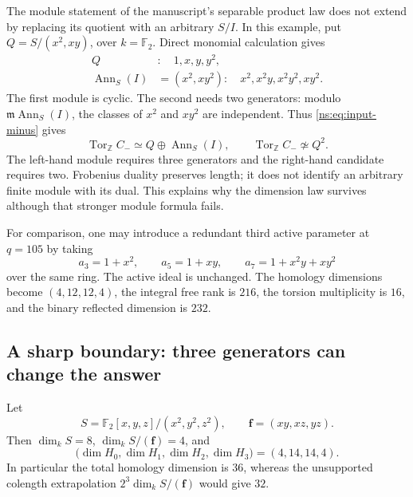 The module statement of the manuscript's separable product law does not
extend by replacing its quotient with an arbitrary $S/I$. In this example,
put $Q=S/(x^2,xy)$, over $k=\mathbb F_2$. Direct monomial calculation gives
\begin{align*}
 Q&:\quad 1,x,y,y^2,\\
 \operatorname{Ann}_S(I)&=(x^2,xy^2):\quad
             x^2,x^2y,x^2y^2,xy^2.
\end{align*}
The first module is cyclic. The second needs two generators: modulo
$\mathfrak m\operatorname{Ann}_S(I)$, the classes of $x^2$ and $xy^2$ are
independent. Thus \eqref{ns:eq:input-minus} gives
\begin{equation}\label{ns:eq:module-obstruction}
 \operatorname{Tor}_{\mathbb Z}C_-
 \simeq Q\oplus\operatorname{Ann}_S(I),
 \qquad
 \operatorname{Tor}_{\mathbb Z}C_-\not\simeq Q^2.
\end{equation}
The left-hand module requires three generators and the right-hand candidate
requires two. Frobenius duality preserves length; it does not identify an
arbitrary finite module with its dual. This explains why the dimension law
survives although that stronger module formula fails.

For comparison, one may introduce a redundant third active parameter at
$q=105$ by taking
\[
 a_3=1+x^2,\qquad a_5=1+xy,\qquad a_7=1+x^2y+xy^2
\]
over the same ring. The active ideal is unchanged. The homology dimensions
become $(4,12,12,4)$, the integral free rank is $216$, the torsion multiplicity
is $16$, and the binary reflected dimension is $232$.

\subsection{A sharp boundary: three generators can change the answer}

\begin{proposition}\label{ns:prop:counterexample}
Let
\[
 S=\mathbb F_2[x,y,z]/(x^2,y^2,z^2),\qquad
 \boldsymbol f=(xy,xz,yz).
\]
Then $\dim_kS=8$, $\dim_kS/(\boldsymbol f)=4$, and
\begin{equation}\label{ns:eq:counter-homology}
 \bigl(\dim H_0,\dim H_1,\dim H_2,\dim H_3\bigr)
 =(4,14,14,4).
\end{equation}
In particular the total homology dimension is $36$, whereas the unsupported
colength extrapolation $2^3\dim_kS/(\boldsymbol f)$ would give $32$.
\end{proposition}

